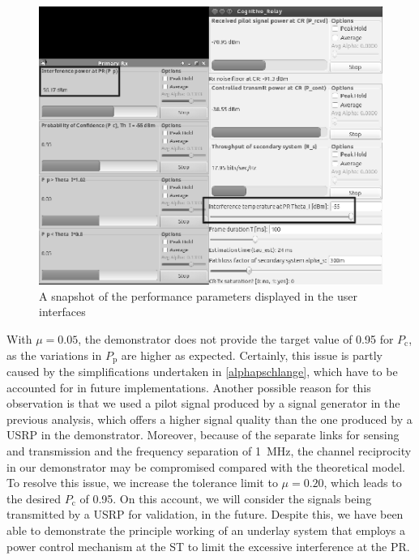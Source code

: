 \begin{figure}
	\centering
	\includegraphics[width=1\textwidth]{figures/interface}
	\caption{A snapshot of the performance parameters displayed in the user interfaces}
	\label{interface}
\end{figure}

With $\mu = 0.05$, the demonstrator does not provide the target value of 0.95 for $P_\textrm{c}$, as the variations in $P_\textrm{p}$ are higher as expected. Certainly, this issue is partly caused by the simplifications undertaken in \ref{alphapschlange}, which have to be accounted for in future implementations. Another possible reason for this observation is that we used a pilot signal produced by a signal generator in the previous analysis, which offers a higher signal quality than the one produced by a USRP in the demonstrator. Moreover, because of the separate links for sensing and transmission and the frequency separation of \SI{1}{MHz}, the channel reciprocity in our demonstrator may be compromised compared with the theoretical model. To resolve this issue, we increase the tolerance limit to $\mu = 0.20$, which leads to the desired $P_\textrm{c}$ of 0.95. On this account, we will consider the signals being transmitted by a USRP for validation, in the future. Despite this, we have been able to demonstrate the principle working of an underlay system that employs a power control mechanism at the ST to limit the excessive interference at the PR.


